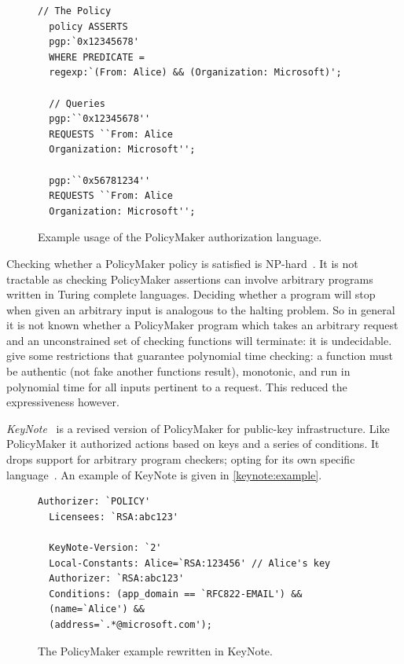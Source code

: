 \documentclass[a4paper,sfsidenotes]{%
  scrartcl%
}
\begin{document}
\begin{figure}
  \begin{lstlisting}[language=PolicyMaker]
  // The Policy
  policy ASSERTS
  pgp:`0x12345678'
  WHERE PREDICATE =
  regexp:`(From: Alice) && (Organization: Microsoft)';

  // Queries
  pgp:``0x12345678''
  REQUESTS ``From: Alice
  Organization: Microsoft'';

  pgp:``0x56781234''
  REQUESTS ``From: Alice
  Organization: Microsoft'';
  \end{lstlisting}
  \caption{Example usage of the PolicyMaker authorization language.} 
  \label{policymaker:alice}
\end{figure}

Checking whether a PolicyMaker policy is satisfied is
NP-hard~\cite{Blaze:1998fq}.  It is not tractable as checking PolicyMaker
assertions can involve arbitrary programs written in Turing complete languages.
Deciding whether a program will stop when given an arbitrary input is analogous
to the halting problem.  So in general it is not known whether a PolicyMaker
program which takes an arbitrary request and an unconstrained set of checking
functions will terminate: it is undecidable.  \citeauthor{Blaze:1998fq} give some
restrictions that guarantee polynomial time checking: a function must be
authentic (not fake another functions result), monotonic, and run in polynomial
time for all inputs pertinent to a request.  This reduced the expressiveness
however.

\emph{KeyNote}~\cite{Blaze:1999fa} is a revised version of PolicyMaker
for public-key infrastructure.  Like PolicyMaker it authorized actions based on
keys and a series of conditions.  It drops support for arbitrary program
checkers; opting for its own specific language~\cite{Blaze:1999vc}.  An example
of KeyNote is given in \autoref{keynote:example}. 

\begin{figure}
  \begin{lstlisting}[language=KeyNote]
  Authorizer: `POLICY'
  Licensees: `RSA:abc123'

  KeyNote-Version: `2'
  Local-Constants: Alice=`RSA:123456' // Alice's key
  Authorizer: `RSA:abc123'
  Conditions: (app_domain == `RFC822-EMAIL') &&
  (name=`Alice') &&
  (address=`.*@microsoft.com');
  \end{lstlisting}
  \caption{The PolicyMaker example rewritten in KeyNote.}

  \label{keynote:example}
\end{figure}
\end{document}
